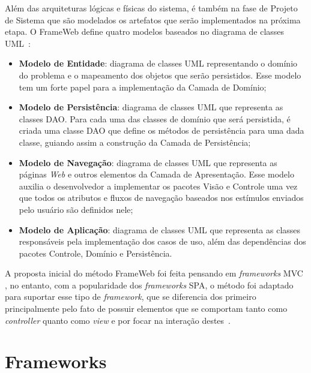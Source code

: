 Além das arquiteturas lógicas e físicas do sistema, é também na fase de Projeto de Sistema
que são modelados os artefatos que serão implementados na próxima etapa. O FrameWeb define
quatro modelos baseados no diagrama de classes UML~\cite{souza:2007,souza:2020}:


\begin{itemize}
    \item \textbf{Modelo de Entidade}: diagrama de classes UML representando o domínio do 
        problema e o mapeamento dos objetos que serão persistidos. Esse modelo tem um forte
        papel para a implementação da Camada de Domínio;

    \item \textbf{Modelo de Persistência}: diagrama de classes UML que representa as classes
        DAO. Para cada uma das classes de domínio que será persistida, é criada uma classe DAO
        que define os métodos de persistência para uma dada classe, guiando assim a 
        construção da Camada de Persistência;
    
    \item \textbf{Modelo de Navegação}: diagrama de classes UML que representa as páginas \textit{Web}
        e outros elementos da Camada de Apresentação. Esse modelo auxilia o desenvolvedor a
        implementar os pacotes Visão e Controle uma vez que todos os atributos e fluxos de 
        navegação baseados nos estímulos enviados pelo usuário são definidos nele;

    \item \textbf{Modelo de Aplicação}: diagrama de classes UML que representa as classes
        responsáveis pela implementação dos casos de uso, além das dependências dos pacotes
        Controle, Domínio e Persistência.
\end{itemize}

A proposta inicial do método FrameWeb foi feita pensando em \textit{frameworks} MVC \cite{souza:2007},
no entanto, com a popularidade dos \textit{frameworks} SPA, o método foi adaptado para suportar
esse tipo de \textit{framework}, que se diferencia dos primeiro principalmente pelo fato de possuir elementos que se comportam tanto como \textit{controller} quanto como 
\textit{view} e por focar na interação destes~\cite{hoppe:2023}.


\section{Frameworks}
\label{sec-fundteo-framework}

